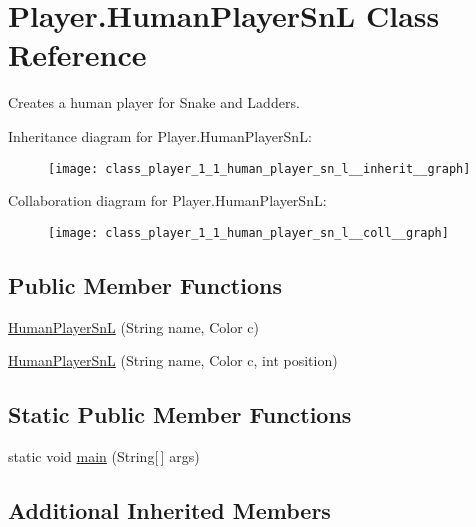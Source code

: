 \hypertarget{class_player_1_1_human_player_sn_l}{}\section{Player.\+Human\+Player\+Sn\+L Class Reference}
\label{class_player_1_1_human_player_sn_l}


Creates a human player for Snake and Ladders.  




Inheritance diagram for Player.\+Human\+Player\+Sn\+L\+:
\nopagebreak
\begin{figure}[H]
\begin{center}
\leavevmode
\texttt{[image: class\_player\_1\_1\_human\_player\_sn\_l\_\_inherit\_\_graph]}
\end{center}
\end{figure}


Collaboration diagram for Player.\+Human\+Player\+Sn\+L\+:
\nopagebreak
\begin{figure}[H]
\begin{center}
\leavevmode
\texttt{[image: class\_player\_1\_1\_human\_player\_sn\_l\_\_coll\_\_graph]}
\end{center}
\end{figure}
\subsection*{Public Member Functions}
\begin{DoxyCompactItemize}
\item 
\hyperlink{class_player_1_1_human_player_sn_l_a7605b134f337342fedb834ec55a03b7a}{Human\+Player\+Sn\+L} (String name, Color c)
\item 
\hyperlink{class_player_1_1_human_player_sn_l_ab22f9ceaee8c00bd22b6372d54452391}{Human\+Player\+Sn\+L} (String name, Color c, int position)
\end{DoxyCompactItemize}
\subsection*{Static Public Member Functions}
\begin{DoxyCompactItemize}
\item 
static void \hyperlink{class_player_1_1_human_player_sn_l_a74ccdaec9a1d4188bd8c6c79b2c7f712}{main} (String\mbox{[}$\,$\mbox{]} args)
\end{DoxyCompactItemize}
\subsection*{Additional Inherited Members}


